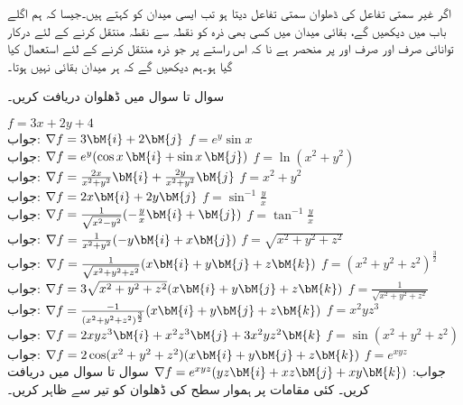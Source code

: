 اگر غیر سمتی تفاعل کی ڈھلوان سمتی تفاعل دیتا ہو تب ایسی میدان کو  کہتے ہیں۔جیسا کہ ہم اگلے باب میں دیکھیں گے، بقائی میدان میں کسی بھی ذرہ کو نقطہ  سے نقطہ  منتقل کرنے کے لئے درکار توانائی صرف اور صرف  اور  پر منحصر ہے نا کہ اس راستے پر جو ذرہ منتقل کرنے کے لئے استعمال کیا گیا ہو۔ہم دیکھیں گے کہ ہر میدان بقائی نہیں ہوتا۔

سوال  تا سوال  میں ڈھلوان  دریافت کریں۔ 

\quad 
$f=3x+2y+4$\\
جواب:\quad
$\nabla f=3\bM{i}+2\bM{j}$
\quad 
$f=e^y\sin x$\\
جواب:\quad
$\nabla f=e^y(\cos x\,\bM{i}+\sin x\,\bM{j})$
\quad 
$f=\ln(x^2+y^2)$\\
جواب:\quad
$\nabla f=\frac{2x}{x^2+y^2}\bM{i}+\frac{2y}{x^2+y^2}\bM{j}$
\quad 
$f=x^2+y^2$\\
جواب:\quad
$\nabla f=2x\bM{i}+2y\bM{j}$
\quad 
$f=\sin^{-1}\frac{y}{x}$\\
جواب:\quad
$\nabla f=\frac{1}{\sqrt{x^2-y^2}}(-\frac{y}{x}\bM{i}+\bM{j})$
\quad 
$f=\tan^{-1}\frac{y}{x}$\\
جواب:\quad
$\nabla f=\frac{1}{x^2+y^2}(-y\bM{i}+x\bM{j})$
\quad 
$f=\sqrt{x^2+y^2+z^2}$\\
جواب:\quad
$\nabla f=\frac{1}{\sqrt{x^2+y^2+z^2}}(x\bM{i}+y\bM{j}+z\bM{k})$
\quad 
$f=(x^2+y^2+z^2)^{\frac{3}{2}}$\\
جواب:\quad
$\nabla f=3\sqrt{x^2+y^2+z^2}(x\bM{i}+y\bM{j}+z\bM{k})$
\quad 
$f=\frac{1}{\sqrt{x^2+y^2+z^2}}$\\
جواب:\quad
$\nabla f=\frac{-1}{(x^2+y^2+z^2)^{\frac{3}{2}}}(x\bM{i}+y\bM{j}+z\bM{k})$
\quad 
$f=x^2yz^3$\\
جواب:\quad
$\nabla f=2xyz^3\bM{i}+x^2z^3\bM{j}+3x^2yz^2\bM{k}$
\quad 
$f=\sin(x^2+y^2+z^2)$\\
جواب:\quad
$\nabla f=2\cos(x^2+y^2+z^2)(x\bM{i}+y\bM{j}+z\bM{k})$
\quad 
$f=e^{xyz}$\\
جواب:\quad
$\nabla f=e^{xyz}(yz\bM{i}+xz\bM{j}+xy\bM{k})$
سوال  تا سوال  میں  دریافت کریں۔ کئی مقامات پر ہموار سطح  کی ڈھلوان  کو تیر سے ظاہر کریں۔ 

